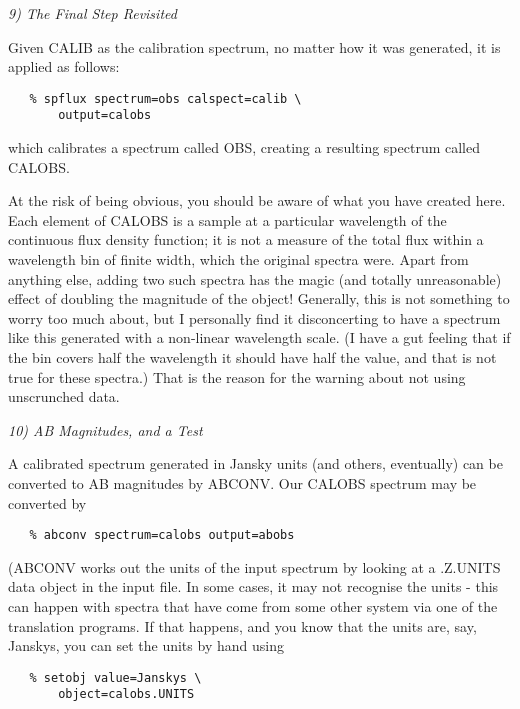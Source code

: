 \goodbreak
\vspace{12pt}
{\it 9) The Final Step Revisited}

Given CALIB as the calibration spectrum, no matter how it was
generated, it is applied as follows:

\begin{verbatim}
   % spflux spectrum=obs calspect=calib \
       output=calobs
\end{verbatim}

which calibrates a spectrum called OBS, creating a resulting spectrum
called CALOBS.

At the risk of being obvious, you should be aware of what you have
created here.  Each element of CALOBS is a sample at a particular wavelength
of the continuous flux density function; it is not a measure of the total
flux within a wavelength bin of finite width, which the original spectra
were.  Apart from anything else, adding two such spectra has the magic
(and totally unreasonable) effect of doubling the magnitude of the object!
Generally, this is not something to worry too much about, but I personally
find it disconcerting to have a spectrum like this generated with a
non-linear wavelength scale. (I have a gut feeling that if the bin covers
half the wavelength it should have half the value, and that is not true
for these spectra.) That is the reason for the warning about not using
unscrunched data.


\goodbreak
\vspace{12pt}
{\it 10) AB Magnitudes, and a Test}

A calibrated spectrum generated in Jansky units (and others,
eventually) can be converted to AB magnitudes by ABCONV.  Our CALOBS
spectrum may be converted by

\begin{verbatim}
   % abconv spectrum=calobs output=abobs
\end{verbatim}

(ABCONV works out the units of the input spectrum by looking at
a .Z.UNITS data object in the input file.  In some cases, it may not
recognise the units - this can happen with spectra that have come from
some other system via one of the translation programs.  If that happens,
and you know that the units are, say, Janskys, you can set the units
by hand using

\begin{verbatim}
   % setobj value=Janskys \
       object=calobs.UNITS
\end{verbatim}

